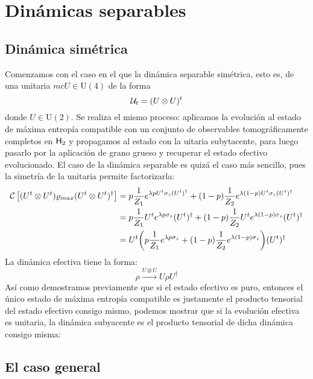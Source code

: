 \section{Dinámicas separables}

\subsection{Dinámica simétrica}

Comenzamos con el caso en el que la dinámica separable simétrica, esto es, de una unitaria $mcU\in\text{U}(4)$ de la forma
\begin{equation*}
    \mathcal{U}_{t}=(U \otimes U)^{t}
\end{equation*}
donde $U\in\text{U}(2)$. Se realiza el mismo proceso: aplicamos la evolución al estado de máxima entropía compatible con un conjunto de observables tomográficamente completos en ${\sf H}_{2}$ y propagamos al estado con la uitaria subytacente, para luego pasarlo por la aplicación de grano grueso y recuperar el estado efectivo evolucionado. El caso de la dinámica separable es quizá el caso más sencillo, pues la simetría de la unitaria permite factorizarla:
\begin{align*}
\mathcal{C}\left[(U^{t}\otimes U^{t})\varrho_{max}(U^{t}\otimes U^{t})^{\dag}\right]&=p\frac{1}{Z_{1}}e^{\lambda p U^{t}\sigma_{z}(U^t)^{\dag}}+(1-p)\frac{1}{Z_{2}}e^{\lambda (1-p)U^{t}\sigma_{z}(U^t)^{\dag}}\\
&=p\frac{1}{Z_{1}}U^{t}e^{\lambda p \sigma_{z}}(U^t)^{\dag}+(1-p)\frac{1}{Z_{2}}U^{t}e^{\lambda (1-p)\sigma_{z}}(U^t)^{\dag}\\
&=U^{t}\qty(p\frac{1}{Z_{1}}e^{\lambda p \sigma_{z}}+(1-p)\frac{1}{Z_{2}}e^{\lambda (1-p)\sigma_{z}})(U^t)^{\dag}\\
\end{align*}
La dinámica efectiva tiene la forma:
\begin{equation}
    \rho\xrightarrow{U\otimes U}U\rho U^{\dagger}
\end{equation}
Así como demostramos previamente que si el estado efectivo es puro, entonces el único estado de máxima entropía compatible es justamente el producto tensorial del estado efectivo consigo mismo, podemos mostrar que si la evolución efectiva es unitaria, la dinámica subyacente es el producto tensorial de dicha dinámica consigo misma:

\subsection{El caso general}


